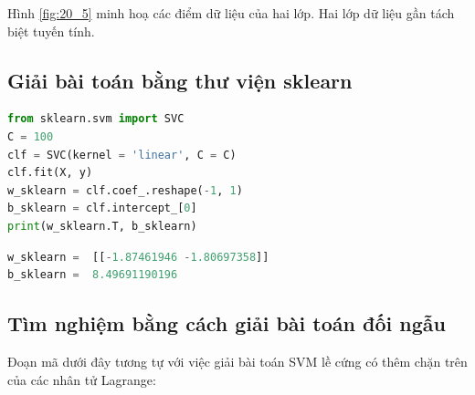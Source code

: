 Hình \ref{fig:20_5} minh hoạ các điểm dữ liệu của hai lớp. Hai lớp dữ liệu gần tách biệt tuyến tính.


\subsection{Giải bài toán bằng thư viện sklearn}

\begin{lstlisting}[language=Python]
from sklearn.svm import SVC
C = 100
clf = SVC(kernel = 'linear', C = C)
clf.fit(X, y)
w_sklearn = clf.coef_.reshape(-1, 1)
b_sklearn = clf.intercept_[0]
print(w_sklearn.T, b_sklearn)
\end{lstlisting}
\kq
\begin{lstlisting}[language=Python]
w_sklearn =  [[-1.87461946 -1.80697358]]
b_sklearn =  8.49691190196
\end{lstlisting}


\subsection{Tìm nghiệm bằng cách giải bài toán đối ngẫu }

Đoạn mã dưới đây tương tự với việc giải bài toán SVM lề cứng có thêm chặn trên của các nhân tử Lagrange:

